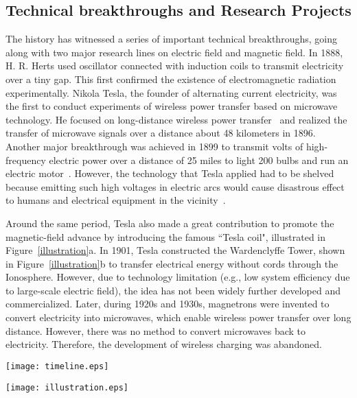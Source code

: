 \documentclass[twocolumn,10pt]{IEEEtran}
\begin{document}
\subsection{Technical breakthroughs and Research Projects}
The history has witnessed a series of important technical breakthroughs, going along with two major research lines on electric field and magnetic field. In 1888, H. R. Herts used oscillator connected with induction coils to transmit electricity over a tiny gap. This first confirmed the existence of electromagnetic radiation experimentally. Nikola Tesla, the founder of alternating current electricity, was the first to conduct experiments of wireless power transfer based on microwave technology. He focused on long-distance wireless power transfer~\cite{N.1914Tesla} and realized the transfer of microwave signals over a distance about 48 kilometers in 1896. Another major breakthrough was achieved in 1899 to transmit  volts of high-frequency electric power over a distance of 25 miles to light 200 bulbs and run an electric motor~\cite{N.1914Tesla}. However, the technology that Tesla applied had to be shelved because emitting such high voltages in electric arcs would cause disastrous effect to humans and electrical equipment in the vicinity~\cite{R.2009Bhutkar}. 

Around the same period, Tesla also made a great contribution to promote the magnetic-field advance by introducing the famous ``Tesla coil", illustrated in Figure~\ref{illustration}a. In 1901, Tesla constructed the Wardenclyffe Tower, shown in Figure~\ref{illustration}b to transfer electrical energy without cords through the Ionosphere. However, due to technology limitation (e.g., low system efficiency due to large-scale electric field), the idea has not been widely further developed and commercialized. Later, during 1920s and 1930s, magnetrons were invented to convert electricity into microwaves, which enable wireless power transfer over long distance. However, there was no method to convert microwaves back to electricity. Therefore, the development of wireless charging was abandoned.  


\begin{figure*} 
\centering
\texttt{[image: timeline.eps]}
\caption{A brief development history of wireless power transmission.} \label{timeline}
\end{figure*}
 

\begin{figure*}
\centering
\texttt{[image: illustration.eps]}
\caption{Illustrations of wireless power transmission systems. a) Tesla coil~\cite{teslauniverse},  b) Wardenclyffe Tower~\cite{M.1981Cheney}, c) Microwave-powered airplane~\cite{airplanesandrockets}, d) JPL’s Goldstone Facility~\cite{jpl}, e) Witricity system~\cite{topnews}, f) Powercaster transmitter and harvester~\cite{Powercast}, g) Qi charging pads~\cite{Energizer,zens,bitmore}, h) Magnetic MIMO system~\cite{J.2014Jadidian}. (IEEE Copyright)} \label{illustration}
\end{figure*} 
\end{document}
